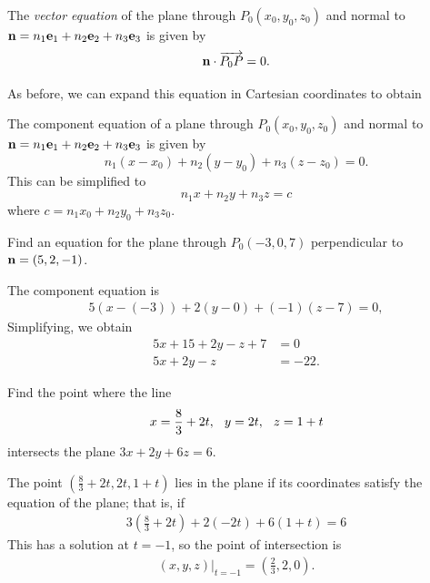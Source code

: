\documentclass[12pt,letterpaper,reqno]{article}
\numberwithin{equation}{section}
\newcommand{\ti}[1]{\textit{#1}}
\begin{document}
\begin{defn}
	The \ti{vector equation} of the plane through $P_0(x_0,y_0,z_0)$ and normal to ${\bf n}=n_1{\bf e}_1+n_2{\bf e}_2+n_3{\bf e}_3$ is given by
	\begin{equation}
		{\bf n} \cdot \overrightarrow{P_0P}=0.
	\end{equation}
\end{defn}

As before, we can expand this equation in Cartesian coordinates to obtain

\begin{defn}
	The component equation of a plane through $P_0(x_0,y_0,z_0)$ and normal to ${\bf n}=n_1{\bf e}_1+n_2{\bf e}_2+n_3{\bf e}_3$ is given by
	\begin{equation}
		n_1(x-x_0)+n_2(y-y_0)+n_3(z-z_0)=0.
	\end{equation}
	This can be simplified to 
	\begin{equation}
		n_1x+n_2y+n_3z=c
	\end{equation}
	where $c=n_1x_0+n_2y_0+n_3z_0$.
\end{defn}

\begin{exercise}
Find an equation for the plane through $P_0(-3,0,7)$ perpendicular to ${\bf n}=(5,2,-1)$.	
\end{exercise}

{\color{red} 
The component equation is 
\begin{align*}
	5(x-(-3))+2(y-0)+(-1)(z-7)=0,
\end{align*}
Simplifying, we obtain
\begin{align*}
	5x+15+2y-z+7&=0 \\
	5x+2y-z&=-22.
\end{align*}}

\begin{exercise}
Find the point where the line 
\begin{align*}
	x=\frac{8}{3}+2t, \hspace{0.25cm} y=2t, \hspace{0.25cm} z=1+t
\end{align*}	
intersects the plane $3x+2y+6z=6$.
\end{exercise}

{\color{red} 
The point $(\frac{8}{3}+2t, 2t, 1+t)$ lies in the plane if its coordinates satisfy the equation of the plane; that is, if
\begin{align*}
	3(\frac{8}{3}+2t)+2(-2t)+6(1+t)=6
\end{align*}
This has a solution at $t=-1$, so the point of intersection is 
\begin{align*}
	(x,y,z)\vert_{t=-1}=(\frac{2}{3},2,0).
\end{align*}}
\end{document}

